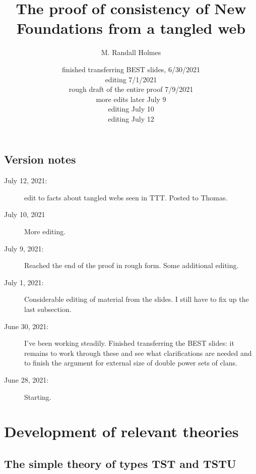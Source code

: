 \documentclass[12pt]{article}
\title{The proof of consistency of New Foundations from a tangled web}
\author{M. Randall Holmes}
\date{finished transferring BEST slides, 6/30/2021 \\ editing 7/1/2021 \\ rough draft of the entire proof 7/9/2021 \\ more edits later July 9 \\editing July 10\\editing July 12}
\begin{document}
\maketitle

\maketitle

\newpage

\subsection{Version notes}

\begin{description}

\item[July 12, 2021: ] edit to facts about tangled webs seen in TTT.  Posted to Thomas.

\item[July 10, 2021]  More editing.

\item[July 9, 2021:]  Reached the end of the proof in rough form.  Some additional editing.

\item[July 1, 2021:]  Considerable editing of material from the slides.  I still have to fix up the last subsection.

\item[June 30, 2021:]  I've been working steadily.  Finished transferring the BEST slides:  it remains to work through these and see what clarifications are needed and to finish the
argument for external size of double power sets of clans.

\item[June 28, 2021:]  Starting.



\end{description}


\newpage

\tableofcontents

\newpage

\section{Development of relevant theories}

\subsection{The simple theory of types TST and TSTU}
\end{document}

